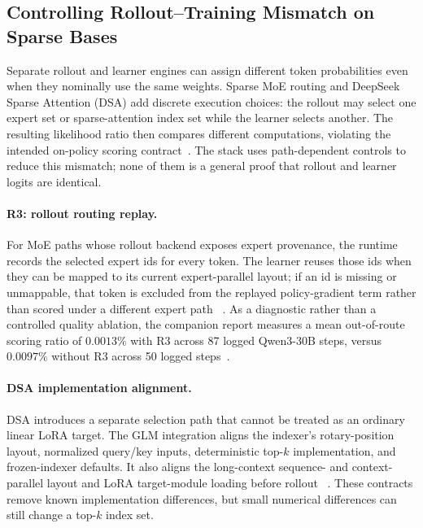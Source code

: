 \subsection{Controlling Rollout--Training Mismatch on Sparse Bases}
\label{sec:infra_stability}

Separate rollout and learner engines can assign different token probabilities
even when they nominally use the same weights. Sparse MoE routing and DeepSeek
Sparse Attention (DSA) add discrete execution choices: the rollout may select
one expert set or sparse-attention index set while the learner selects another.
The resulting likelihood ratio then compares different computations, violating
the intended on-policy scoring contract~\citep{rollout_training_mismatch2025}.
The stack uses path-dependent controls to reduce this mismatch; none of them is
a general proof that rollout and learner logits are identical.

\paragraph{R3: rollout routing replay.}
For MoE paths whose rollout backend exposes expert provenance, the runtime
records the selected expert ids for every token. The learner reuses those ids
when they can be mapped to its current expert-parallel layout; if an id is
missing or unmappable, that token is excluded from the replayed policy-gradient
term rather than scored under a different expert path
~\citep{r3_moe_router2025,chiang2026routerreplay}. As a diagnostic rather than a
controlled quality ablation, the companion \mint{} report measures a mean
out-of-route scoring ratio of $0.0013\%$ with R3 across 87 logged Qwen3-30B steps,
versus $0.0097\%$ without R3 across 50 logged steps~\citep{lu2026announcing}.

\paragraph{DSA implementation alignment.}
DSA introduces a separate selection path that cannot be treated as an ordinary
linear LoRA target. The GLM integration aligns the indexer's rotary-position
layout, normalized query/key inputs, deterministic top-$k$ implementation, and
frozen-indexer defaults. It also aligns the long-context sequence- and
context-parallel layout and LoRA target-module loading before rollout
~\citep{stevenchiang2026supportglm5inmint}. These contracts remove known
implementation differences, but small numerical differences can still change a
top-$k$ index set.

